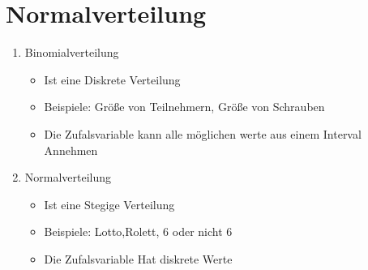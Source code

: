 \newpage
\section{Normalverteilung}

\hfill \break

\begin{enumerate}
    \item Binomialverteilung \begin{itemize}
        \item Ist eine Diskrete Verteilung
        \item Beispiele: Größe von Teilnehmern, Größe von Schrauben
        \item Die Zufalsvariable kann alle möglichen werte aus einem Interval Annehmen
    \end{itemize}
    \item Normalverteilung \begin{itemize}
        \item Ist eine Stegige Verteilung
        \item Beispiele: Lotto,Rolett, 6 oder nicht 6 
        \item Die Zufalsvariable Hat diskrete Werte
    \end{itemize}
\end{enumerate}

\hfill \break

\break

\break

